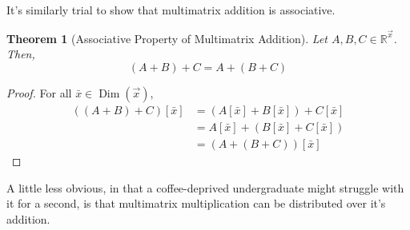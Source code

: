 \documentclass[12pt]{book}
\theoremstyle{plain}
\newtheorem{theorem}{Theorem}[chapter]
\theoremstyle{definition}
\theoremstyle{ppart}
\theoremstyle{case}
\theoremstyle{solution}
\DeclareMathOperator{\Dim}{Dim}
\begin{document}
It's similarly trial to show that multimatrix addition is associative.

\begin{theorem}[Associative Property of Multimatrix Addition]
Let $A, B, C \in \mathbb{R}^{\vec{x}}$. Then,
\[ (A + B) + C = A + (B + C) \]
\end{theorem}
\begin{proof}
For all $\bar{x} \in \Dim(\vec{x})$,
\begin{align*}
\left( (A+B)+C \right)[\bar{x}]
&= (A[\bar{x}]+B[\bar{x}])+C[\bar{x}] \\
&= A[\bar{x}]+(B[\bar{x}]+C[\bar{x}]) \\
&= \left( A+(B+C) \right)[\bar{x}]
\end{align*}
\end{proof}

A little less obvious, in that a coffee-deprived undergraduate might
struggle with it for a second, is that multimatrix multiplication can be
distributed over it's addition.
\end{document}
